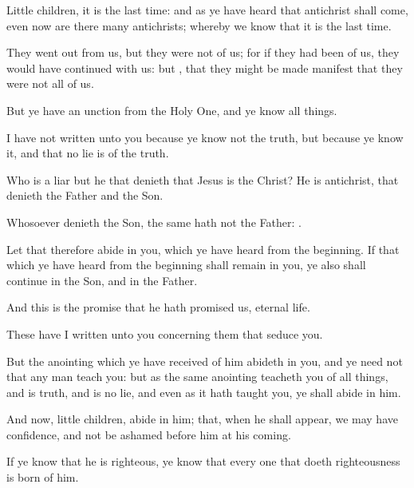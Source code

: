 {\par }{\PP {}Little
children, it
is
the
last
time:
and
as ye have
heard
that
antichrist shall
come,
even
now are
there
many
antichrists;
whereby we
know
that it
is
the
last
time.

They
went out
from
us,
but they
were
not
of
us;
for
if they had
been
of
us, they
would
{} have
continued
with
us:
but
{},
that they might be made
manifest
that they
were
not
all
of
us.

But
ye
have an
unction
from the Holy
One,
and ye
know all
things.

I
have
not
written unto
you
because ye
know
not the
truth,
but
because ye
know
it,
and
that
no
lie
is
of the
truth.

Who
is a
liar
but he that
denieth
that
Jesus
is the
Christ? He
is
antichrist,
that
denieth the
Father
and the
Son.

Whosoever
denieth the
Son, the same
hath
not the
Father:
{}.

Let
that
therefore
abide
in
you,
which ye have
heard
from the
beginning.
If that
which ye have
heard
from the
beginning shall
remain
in
you,
ye
also shall
continue
in the
Son,
and
in the
Father.

And
this
is the
promise
that
he hath
promised
us,
{}
eternal
life.

These
{} have I
written unto
you
concerning them that
seduce
you.

But the
anointing
which
ye have
received
of
him
abideth
in
you,
and ye
need
not
that any
man
teach
you:
but
as the
same
anointing
teacheth
you
of all
things,
and
is
truth,
and
is
no
lie,
and even
as it hath
taught
you, ye shall
abide
in
him.

And
now, little
children,
abide
in
him;
that,
when he shall
appear, we may
have
confidence,
and
not be
ashamed
before
him
at
his
coming.

If ye
know
that he
is
righteous, ye
know
that every
one
that
doeth
righteousness is
born
of
him.




\par }
